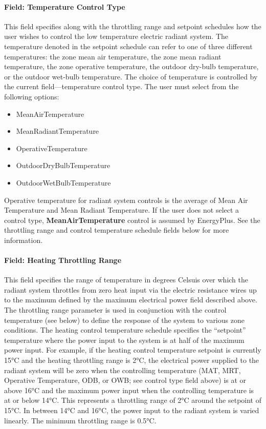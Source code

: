 \paragraph{Field: Temperature Control Type}\label{field-temperature-control-type-2}

This field specifies along with the throttling range and setpoint schedules how the user wishes to control the low temperature electric radiant system. The temperature denoted in the setpoint schedule can refer to one of three different temperatures: the zone mean air temperature, the zone mean radiant temperature, the zone operative temperature, the outdoor dry-bulb temperature, or the outdoor wet-bulb temperature. The choice of temperature is controlled by the current field---temperature control type. The user must select from the following options:

\begin{itemize}
\item
  MeanAirTemperature
\item
  MeanRadiantTemperature
\item
  OperativeTemperature
\item
  OutdoorDryBulbTemperature
\item
  OutdoorWetBulbTemperature
\end{itemize}

Operative temperature for radiant system controls is the average of Mean Air Temperature and Mean Radiant Temperature. If the user does not select a control type, \textbf{MeanAirTemperature} control is assumed by EnergyPlus. See the throttling range and control temperature schedule fields below for more information.

\paragraph{Field: Heating Throttling Range}\label{field-heating-throttling-range}

This field specifies the range of temperature in degrees Celsuis over which the radiant system throttles from zero heat input via the electric resistance wires up to the maximum defined by the maximum electrical power field described above. The throttling range parameter is used in conjunction with the control temperature (see below) to define the response of the system to various zone conditions. The heating control temperature schedule specifies the ``setpoint'' temperature where the power input to the system is at half of the maximum power input. For example, if the heating control temperature setpoint is currently 15°C and the heating throttling range is 2°C, the electrical power supplied to the radiant system will be zero when the controlling temperature (MAT, MRT, Operative Temperature, ODB, or OWB; see control type field above) is at or above 16°C and the maximum power input when the controlling temperature is at or below 14°C. This represents a throttling range of 2°C around the setpoint of 15°C. In between 14°C and 16°C, the power input to the radiant system is varied linearly. The minimum throttling range is 0.5°C.

